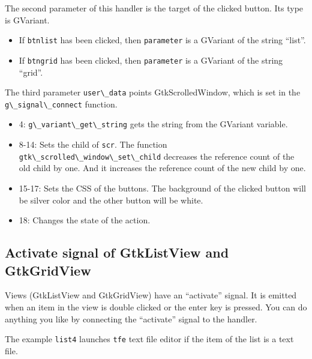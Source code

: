 The second parameter of this handler is the target of the clicked
button. Its type is GVariant.

\begin{itemize}
\tightlist
\item
  If \passthrough{\lstinline!btnlist!} has been clicked, then
  \passthrough{\lstinline!parameter!} is a GVariant of the string
  ``list''.
\item
  If \passthrough{\lstinline!btngrid!} has been clicked, then
  \passthrough{\lstinline!parameter!} is a GVariant of the string
  ``grid''.
\end{itemize}

The third parameter \passthrough{\lstinline!user\_data!} points
GtkScrolledWindow, which is set in the
\passthrough{\lstinline!g\_signal\_connect!} function.

\begin{itemize}
\tightlist
\item
  4: \passthrough{\lstinline!g\_variant\_get\_string!} gets the string
  from the GVariant variable.
\item
  8-14: Sets the child of \passthrough{\lstinline!scr!}. The function
  \passthrough{\lstinline!gtk\_scrolled\_window\_set\_child!} decreases
  the reference count of the old child by one. And it increases the
  reference count of the new child by one.
\item
  15-17: Sets the CSS of the buttons. The background of the clicked
  button will be silver color and the other button will be white.
\item
  18: Changes the state of the action.
\end{itemize}

\hypertarget{activate-signal-of-gtklistview-and-gtkgridview}{%
\subsection{Activate signal of GtkListView and
GtkGridView}\label{activate-signal-of-gtklistview-and-gtkgridview}}

Views (GtkListView and GtkGridView) have an ``activate'' signal. It is
emitted when an item in the view is double clicked or the enter key is
pressed. You can do anything you like by connecting the ``activate''
signal to the handler.

The example \passthrough{\lstinline!list4!} launches
\passthrough{\lstinline!tfe!} text file editor if the item of the list
is a text file.

